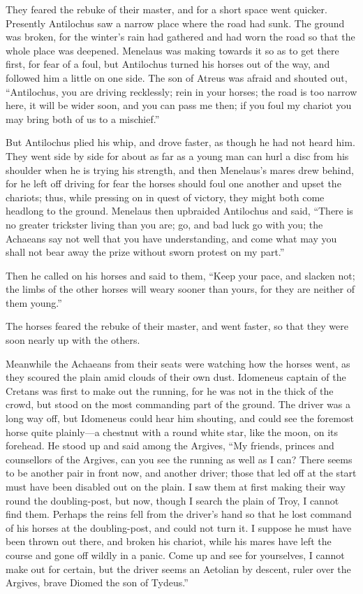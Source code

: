 They feared the rebuke of their master, and for a short space went
quicker. Presently Antilochus saw a narrow place where the road had sunk.
The ground was broken, for the winter’s rain had gathered and had worn the
road so that the whole place was deepened. Menelaus was making towards it
so as to get there first, for fear of a foul, but Antilochus turned his
horses out of the way, and followed him a little on one side. The son of
Atreus was afraid and shouted out, “Antilochus, you are driving
recklessly; rein in your horses; the road is too narrow here, it will be
wider soon, and you can pass me then; if you foul my chariot you may bring
both of us to a mischief.”

But Antilochus plied his whip, and drove faster, as though he had not
heard him. They went side by side for about as far as a young man can hurl
a disc from his shoulder when he is trying his strength, and then
Menelaus’s mares drew behind, for he left off driving for fear the horses
should foul one another and upset the chariots; thus, while pressing on in
quest of victory, they might both come headlong to the ground. Menelaus
then upbraided Antilochus and said, “There is no greater trickster living
than you are; go, and bad luck go with you; the Achaeans say not well that
you have understanding, and come what may you shall not bear away the
prize without sworn protest on my part.”

Then he called on his horses and said to them, “Keep your pace, and
slacken not; the limbs of the other horses will weary sooner than yours,
for they are neither of them young.”

The horses feared the rebuke of their master, and went faster, so that
they were soon nearly up with the others.

Meanwhile the Achaeans from their seats were watching how the horses went,
as they scoured the plain amid clouds of their own dust. Idomeneus captain
of the Cretans was first to make out the running, for he was not in the
thick of the crowd, but stood on the most commanding part of the ground.
The driver was a long way off, but Idomeneus could hear him shouting, and
could see the foremost horse quite plainly—a chestnut with a round
white star, like the moon, on its forehead. He stood up and said among the
Argives, “My friends, princes and counsellors of the Argives, can you see
the running as well as I can? There seems to be another pair in front now,
and another driver; those that led off at the start must have been
disabled out on the plain. I saw them at first making their way round the
doubling-post, but now, though I search the plain of Troy, I cannot find
them. Perhaps the reins fell from the driver’s hand so that he lost
command of his horses at the doubling-post, and could not turn it. I
suppose he must have been thrown out there, and broken his chariot, while
his mares have left the course and gone off wildly in a panic. Come up and
see for yourselves, I cannot make out for certain, but the driver seems an
Aetolian by descent, ruler over the Argives, brave Diomed the son of
Tydeus.”

